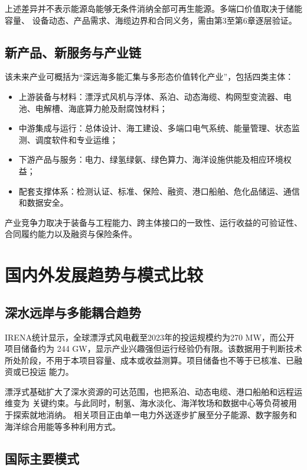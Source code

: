 上述差异并不表示能源岛能够无条件消纳全部可再生能源。多端口价值取决于储能容量、
设备动态、产品需求、海缆边界和合同义务，需由第3至第6章逐层验证。

\subsection{新产品、新服务与产业链}

该未来产业可概括为“深远海多能汇集与多形态价值转化产业”，包括四类主体：
\begin{itemize}
  \item 上游装备与材料：漂浮式风机与浮体、系泊、动态海缆、构网型变流器、电池、电解槽、海底算力舱及耐腐蚀材料；
  \item 中游集成与运行：总体设计、海工建设、多端口电气系统、能量管理、状态监测、调度软件和专业运维；
  \item 下游产品与服务：电力、绿氢绿氨、绿色算力、海洋设施供能及相应环境权益；
  \item 配套支撑体系：检测认证、标准、保险、融资、港口船舶、危化品储运、通信和数据安全。
\end{itemize}

产业竞争力取决于装备与工程能力、跨主体接口的一致性、运行收益的可验证性、合同履约能力以及融资与保险条件。

\section{国内外发展趋势与模式比较}

\subsection{深水远岸与多能耦合趋势}

IRENA统计显示，全球漂浮式风电截至2023年的投运规模约为270 MW，而公开项目储备约为
244 GW，显示产业兴趣强但运行经验仍有限\cite{irena-floating}。该数据用于判断技术
所处阶段，不用于本项目容量、成本或收益测算。项目储备也不等于已核准、已融资或已投运
能力。

漂浮式基础扩大了深水资源的可达范围，也把系泊、动态电缆、港口船舶和远程运维变为
关键约束。与此同时，制氢、海水淡化、海洋牧场和数据中心等负荷被用于探索就地消纳。
相关项目正由单一电力外送逐步扩展至分子能源、数字服务和海洋综合用能等多种利用方式。

\subsection{国际主要模式}


